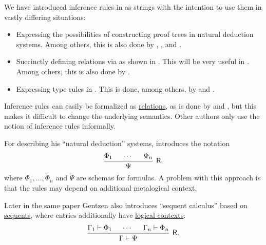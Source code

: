 \begin{remark}\label{rem:inference_rules_semantics}
  We have introduced inference rules in  as strings with the intention to use them in vastly differing situations:
  \begin{itemize}
    \item Expressing the possibilities of constructing proof trees in natural deduction systems. Among others, this is also done by , ,  and .
    \item Succinctly defining relations via  as shown in . This will be very useful in . Among others, this is also done by .
    \item Expressing type rules in . This is done, among others, by  and .
  \end{itemize}

  Inference rules can easily be formalized as \hyperref[def:relation]{relations}, as is done by  and , but this makes it difficult to change the underlying semantics. Other authors only use the notion of inference rules informally.

  For describing his \enquote{natural deduction} systems,  introduces the notation
  \begin{equation*}
    \begin{prooftree}
      \hypo{ \Phi_1 }
      \hypo{ \cdots }
      \hypo{ \Phi_n }
      \infer3[\logic{R}]{ \Psi }
    \end{prooftree},
  \end{equation*}
  where \( \Phi_1, \ldots, \Phi_n \) and \( \Psi \) are schemas for formulas. A problem with this approach is that the rules may depend on additional metalogical context.

  Later in the same paper Gentzen also introduces \enquote{sequent calculus} based on \hyperref[def:sequent]{sequents}, where entries additionally have \hyperref[def:logical_context]{logical contexts}:
  \begin{equation*}
    \begin{prooftree}
      \hypo{ \Gamma_1 \vdash \Phi_1 }
      \hypo{ \cdots }
      \hypo{ \Gamma_n \vdash \Phi_n }
      \infer3[\logic{R}]{ \Gamma \vdash \Psi }
    \end{prooftree},
  \end{equation*}


\end{remark}
